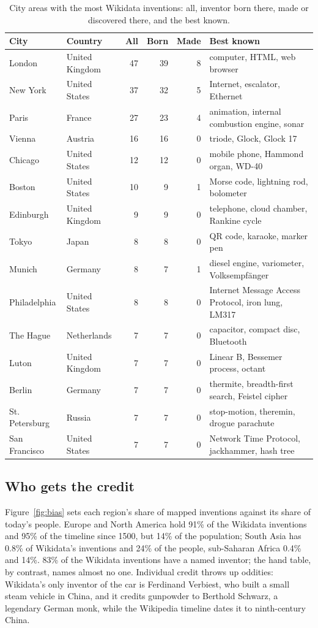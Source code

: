 \documentclass[11pt,a4paper]{article}
\begin{document}
\begin{table}[tbp]\centering\small\caption{City areas with the most Wikidata inventions: all, inventor born there, made or discovered there, and the best known.}\label{tab:cities}\setlength{\tabcolsep}{4pt}\begin{tabular}{llrrrp{6cm}}\toprule City & Country & All & Born & Made & Best known\\\midrule
London & United Kingdom & 47 & 39 & 8 & computer, HTML, web browser\\
New York & United States & 37 & 32 & 5 & Internet, escalator, Ethernet\\
Paris & France & 27 & 23 & 4 & animation, internal combustion engine, sonar\\
Vienna & Austria & 16 & 16 & 0 & triode, Glock, Glock 17\\
Chicago & United States & 12 & 12 & 0 & mobile phone, Hammond organ, WD-40\\
Boston & United States & 10 & 9 & 1 & Morse code, lightning rod, bolometer\\
Edinburgh & United Kingdom & 9 & 9 & 0 & telephone, cloud chamber, Rankine cycle\\
Tokyo & Japan & 8 & 8 & 0 & QR code, karaoke, marker pen\\
Munich & Germany & 8 & 7 & 1 & diesel engine, variometer, Volksempfänger\\
Philadelphia & United States & 8 & 8 & 0 & Internet Message Access Protocol, iron lung, LM317\\
The Hague & Netherlands & 7 & 7 & 0 & capacitor, compact disc, Bluetooth\\
Luton & United Kingdom & 7 & 7 & 0 & Linear B, Bessemer process, octant\\
Berlin & Germany & 7 & 7 & 0 & thermite, breadth-first search, Feistel cipher\\
St. Petersburg & Russia & 7 & 7 & 0 & stop-motion, theremin, drogue parachute\\
San Francisco & United States & 7 & 7 & 0 & Network Time Protocol, jackhammer, hash tree\\
\bottomrule\end{tabular}\end{table}

\subsection{Who gets the credit}
Figure~\ref{fig:bias} sets each region's share of mapped inventions against its share of today's people. Europe and North America hold 91\% of the Wikidata inventions and 95\% of the timeline since 1500, but 14\% of the population; South Asia has 0.8\% of Wikidata's inventions and 24\% of the people, sub-Saharan Africa 0.4\% and 14\%. 83\% of the Wikidata inventions have a named inventor; the hand table, by contrast, names almost no one. Individual credit throws up oddities: Wikidata's only inventor of the car is Ferdinand Verbiest, who built a small steam vehicle in China, and it credits gunpowder to Berthold Schwarz, a legendary German monk, while the Wikipedia timeline dates it to ninth-century China.
\end{document}
